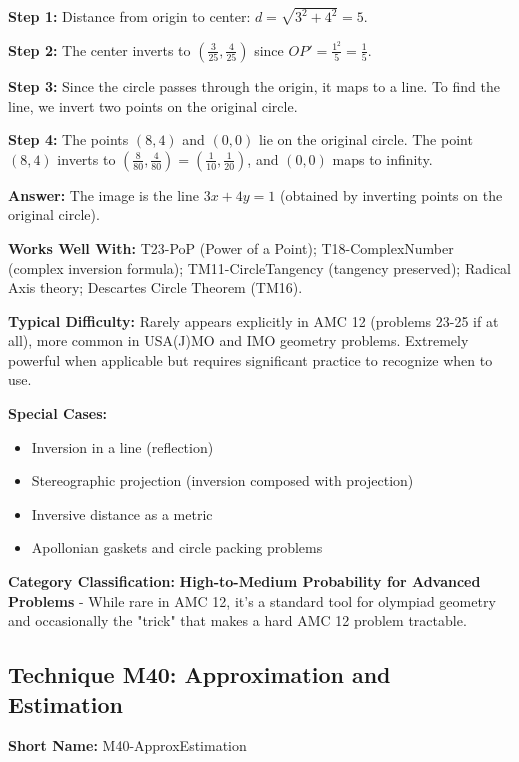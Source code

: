 \documentclass[12pt]{article}
\begin{document}
\begin{itemize}
    \textbf{Step 1:} Distance from origin to center: $d = \sqrt{3^2 + 4^2} = 5$.
    
    \textbf{Step 2:} The center inverts to $(\frac{3}{25}, \frac{4}{25})$ since $OP' = \frac{1^2}{5} = \frac{1}{5}$.
    
    \textbf{Step 3:} Since the circle passes through the origin, it maps to a line. To find the line, we invert two points on the original circle.
    
    \textbf{Step 4:} The points $(8,4)$ and $(0,0)$ lie on the original circle. The point $(8,4)$ inverts to $(\frac{8}{80}, \frac{4}{80}) = (\frac{1}{10}, \frac{1}{20})$, and $(0,0)$ maps to infinity.
    
    \textbf{Answer:} The image is the line $3x + 4y = 1$ (obtained by inverting points on the original circle).
\end{itemize}

\textbf{Works Well With:} T23-PoP (Power of a Point); T18-ComplexNumber (complex inversion formula); TM11-CircleTangency (tangency preserved); Radical Axis theory; Descartes Circle Theorem (TM16).

\textbf{Typical Difficulty:} Rarely appears explicitly in AMC 12 (problems 23-25 if at all), more common in USA(J)MO and IMO geometry problems. Extremely powerful when applicable but requires significant practice to recognize when to use.

\textbf{Special Cases:} 
\begin{itemize}
    \item Inversion in a line (reflection)
    \item Stereographic projection (inversion composed with projection)
    \item Inversive distance as a metric
    \item Apollonian gaskets and circle packing problems
\end{itemize}

\textbf{Category Classification:} \textbf{High-to-Medium Probability for Advanced Problems} - While rare in AMC 12, it's a standard tool for olympiad geometry and occasionally the "trick" that makes a hard AMC 12 problem tractable.

\subsection{Technique M40: Approximation and Estimation}
\textbf{Short Name:} M40-ApproxEstimation
\end{document}
